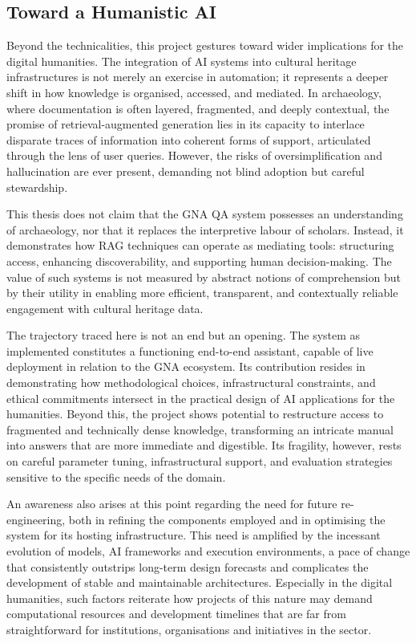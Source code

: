 \begin{spacing}{1.5}
\section{Toward a Humanistic AI}
Beyond the technicalities, this project gestures toward wider implications for the digital humanities. The integration of AI systems into cultural heritage infrastructures is not merely an exercise in automation; it represents a deeper shift in how knowledge is organised, accessed, and mediated. In archaeology, where documentation is often layered, fragmented, and deeply contextual, the promise of retrieval-augmented generation lies in its capacity to interlace disparate traces of information into coherent forms of support, articulated through the lens of user queries. However, the risks of oversimplification and hallucination are ever present, demanding not blind adoption but careful stewardship.

This thesis does not claim that the GNA QA system possesses an understanding of archaeology, nor that it replaces the interpretive labour of scholars. Instead, it demonstrates how RAG techniques can operate as mediating tools: structuring access, enhancing discoverability, and supporting human decision-making. The value of such systems is not measured by abstract notions of comprehension but by their utility in enabling more efficient, transparent, and contextually reliable engagement with cultural heritage data.

The trajectory traced here is not an end but an opening. The system as implemented constitutes a functioning end-to-end assistant, capable of live deployment in relation to the GNA ecosystem. Its contribution resides in demonstrating how methodological choices, infrastructural constraints, and ethical commitments intersect in the practical design of AI applications for the humanities. Beyond this, the project shows potential to restructure access to fragmented and technically dense knowledge, transforming an intricate manual into answers that are more immediate and digestible. Its fragility, however, rests on careful parameter tuning, infrastructural support, and evaluation strategies sensitive to the specific needs of the domain.

An awareness also arises at this point regarding the need for future re-engineering, both in refining the components employed and in optimising the system for its hosting infrastructure. This need is amplified by the incessant evolution of models, AI frameworks and execution environments, a pace of change that consistently outstrips long-term design forecasts and complicates the development of stable and maintainable architectures. Especially in the digital humanities, such factors reiterate how projects of this nature may demand computational resources and development timelines that are far from straightforward for institutions, organisations and initiatives in the sector.


\end{spacing}

